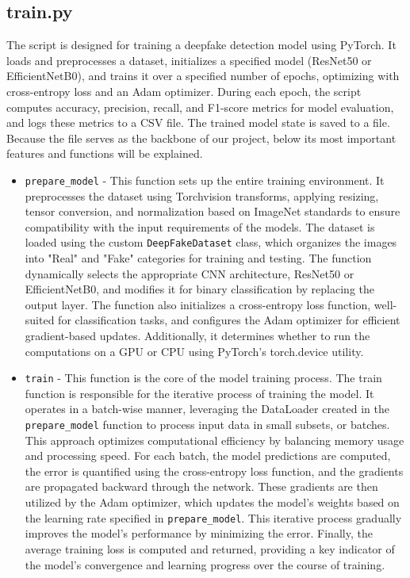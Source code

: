 \documentclass[conference]{IEEEtran}
\begin{document}
    \subsection*{train.py}
    The script is designed for training a deepfake detection model using PyTorch. It loads and preprocesses a dataset, initializes a specified model (ResNet50 or EfficientNetB0), and trains it over a specified number of epochs, optimizing with cross-entropy loss and an Adam optimizer. During each epoch, the script computes accuracy, precision, recall, and F1-score metrics for model evaluation, and logs these metrics to a CSV file. The trained model state is saved to a file. Because the file serves as the backbone of our project, below its most important features and functions will be explained. \\
    \begin{itemize}
        \item \texttt{prepare\_model} - This function sets up the entire training environment. It preprocesses the dataset using Torchvision transforms, applying resizing, tensor conversion, and normalization based on ImageNet standards to ensure compatibility with the input requirements of the models. The dataset is loaded using the custom \texttt{DeepFakeDataset} class, which organizes the images into "Real" and "Fake" categories for training and testing. The function dynamically selects the appropriate CNN architecture, ResNet50 or EfficientNetB0, and modifies it for binary classification by replacing the output layer. The function also initializes a cross-entropy loss function, well-suited for classification tasks, and configures the Adam optimizer for efficient gradient-based updates. Additionally, it determines whether to run the computations on a GPU or CPU using PyTorch’s torch.device utility. \\
        \item \texttt{train} - This function is the core of the model training process. The train function is responsible for the iterative process of training the model. It operates in a batch-wise manner, leveraging the DataLoader created in the \texttt{prepare\_model} function to process input data in small subsets, or batches. This approach optimizes computational efficiency by balancing memory usage and processing speed. For each batch, the model predictions are computed, the error is quantified using the cross-entropy loss function, and the gradients are propagated backward through the network. These gradients are then utilized by the Adam optimizer, which updates the model’s weights based on the learning rate specified in \texttt{prepare\_model}. This iterative process gradually improves the model's performance by minimizing the error. Finally, the average training loss is computed and returned, providing a key indicator of the model's convergence and learning progress over the course of training. \\

\end{itemize}
\end{document}
